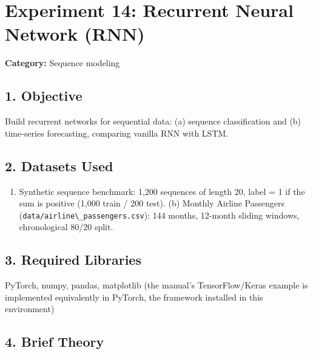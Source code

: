 
\chapter{Experiment 14: Recurrent Neural Network
(RNN)}\label{experiment-14-recurrent-neural-network-rnn}

\textbf{Category:} Sequence modeling

\section{1. Objective}\label{objective}

Build recurrent networks for sequential data: (a) sequence
classification and (b) time-series forecasting, comparing vanilla RNN
with LSTM.

\section{2. Datasets Used}\label{datasets-used}

\begin{enumerate}
\def\labelenumi{(\alph{enumi})}
\tightlist
\item
  Synthetic sequence benchmark: 1,200 sequences of length 20, label = 1
  if the sum is positive (1,000 train / 200 test). (b) Monthly Airline
  Passengers (\passthrough{\lstinline!data/airline\_passengers.csv!}):
  144 months, 12-month sliding windows, chronological 80/20 split.
\end{enumerate}

\section{3. Required Libraries}\label{required-libraries}

PyTorch, numpy, pandas, matplotlib (the manual's TensorFlow/Keras
example is implemented equivalently in PyTorch, the framework installed
in this environment)

\section{4. Brief Theory}\label{brief-theory}


